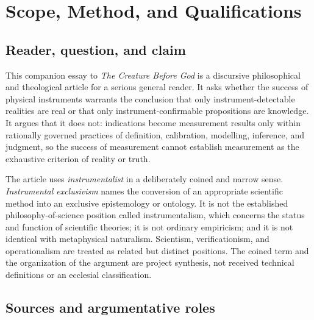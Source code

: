 \section{Scope, Method, and Qualifications}

\subsection{Reader, question, and claim}

This companion essay to \emph{The Creature Before God} is a discursive philosophical and theological article for a serious general reader. It asks whether the success of physical instruments warrants the conclusion that only instrument-detectable realities are real or that only instrument-confirmable propositions are knowledge. It argues that it does not: indications become measurement results only within rationally governed practices of definition, calibration, modelling, inference, and judgment, so the success of measurement cannot establish measurement as the exhaustive criterion of reality or truth.

The article uses \emph{instrumentalist} in a deliberately coined and narrow sense. \emph{Instrumental exclusivism} names the conversion of an appropriate scientific method into an exclusive epistemology or ontology. It is not the established philosophy-of-science position called instrumentalism, which concerns the status and function of scientific theories; it is not ordinary empiricism; and it is not identical with metaphysical naturalism. Scientism, verificationism, and operationalism are treated as related but distinct positions. The coined term and the organization of the argument are project synthesis, not received technical definitions or an ecclesial classification.

\subsection{Sources and argumentative roles}

